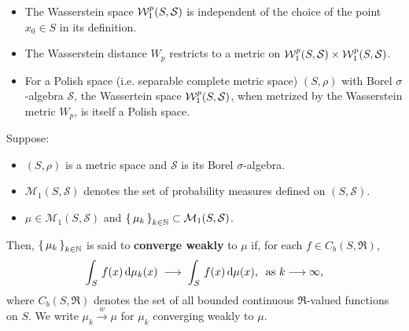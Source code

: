 \begin{theorem}
\label{theorem:WassersteinMetric}
\mbox{}\vskip0cm
\begin{itemize}
\item
	The Wasserstein space $\mathcal{W}^{p}_{1}\!\left(S,\mathcal{S}\right)$ is independent of the
	choice of the point $x_{0} \in S$ in its definition.
\item
	The Wasserstein distance $W_{p}$ restricts to a metric on
	$\mathcal{W}^{p}_{1}\!\left(S,\mathcal{S}\right) \times \mathcal{W}^{p}_{1}\!\left(S,\mathcal{S}\right)$.
\item
	For a Polish space (i.e. separable complete metric space) $(S,\rho)$
	with Borel $\sigma$-algebra $\mathcal{S}$,
	the Wassertein space $\mathcal{W}^{p}_{1}\!\left(S,\mathcal{S}\right)$,
	when metrized by the Wasserstein metric $W_{p}$, is itself a Polish space.
\end{itemize}
\end{theorem}

\begin{definition}
\mbox{}\vskip 0.1cm
\noindent
Suppose:
\begin{itemize}
\item $\left(S,\rho\right)$ is a metric space and $\mathcal{S}$ is its Borel $\sigma$-algebra.
\item $\mathcal{M}_{1}\!\left(S,\mathcal{S}\right)$ denotes the set of probability measures defined on $\left(S,\mathcal{S}\right)$.
\item $\mu \in \mathcal{M}_{1}\!\left(S,\mathcal{S}\right)$ and
	$\left\{\,\mu_{k}\,\right\}_{k\in\mathbb{N}} \subset \mathcal{M}_{1}\!\left(S,\mathcal{S}\right)$.
\end{itemize}
Then, $\left\{\,\mu_{k}\,\right\}_{k\in\mathbb{N}}$ is said to
\textbf{converge weakly} to $\mu$ if, for each $f \in C_{b}(S,\Re)$,
\begin{equation*}
\int_{S}\,f(x)\,\textnormal{d}\mu_{k}(x) \;\longrightarrow\;\int_{S}\,f(x)\,\textnormal{d}\mu(x),
\;\;\textnormal{as $k \longrightarrow \infty$},
\end{equation*}
where $C_{b}(S,\Re)$ denotes the set of all bounded continuous $\Re$-valued functions on $S$.
We write $\mu_{k}\overset{w}{\longrightarrow}\mu$ for $\mu_{k}$ converging weakly to $\mu$.
\end{definition}

